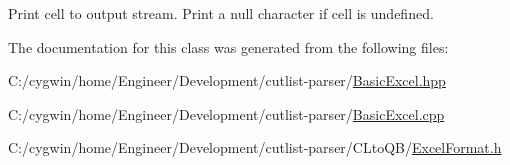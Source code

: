 Print cell to output stream. Print a null character if cell is undefined. 



The documentation for this class was generated from the following files\+:\begin{DoxyCompactItemize}
\item 
C\+:/cygwin/home/\+Engineer/\+Development/cutlist-\/parser/\hyperlink{_basic_excel_8hpp}{Basic\+Excel.\+hpp}\item 
C\+:/cygwin/home/\+Engineer/\+Development/cutlist-\/parser/\hyperlink{_basic_excel_8cpp}{Basic\+Excel.\+cpp}\item 
C\+:/cygwin/home/\+Engineer/\+Development/cutlist-\/parser/\+C\+Lto\+Q\+B/\hyperlink{_c_lto_q_b_2_excel_format_8h}{Excel\+Format.\+h}\end{DoxyCompactItemize}
